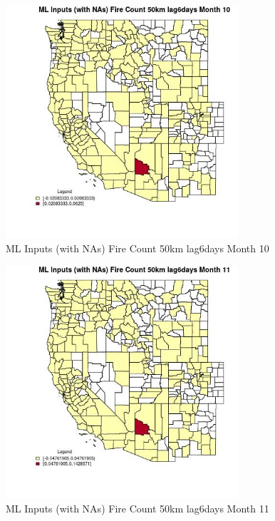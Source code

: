 \begin{figure} 
\centering  
\includegraphics[width=0.77\textwidth]{Code_Outputs/Report_ML_input_PM25_Step4_part_e_de_duplicated_aves_compiled_2019-05-21wNAs_CountyFire_Count_50km_lag6daysmedianMonth10.jpg} 
\caption{\label{fig:Report_ML_input_PM25_Step4_part_e_de_duplicated_aves_compiled_2019-05-21wNAsCountyFire_Count_50km_lag6daysmedianMonth10}ML Inputs (with NAs) Fire Count 50km lag6days Month 10} 
\end{figure} 
 

\clearpage 

\begin{figure} 
\centering  
\includegraphics[width=0.77\textwidth]{Code_Outputs/Report_ML_input_PM25_Step4_part_e_de_duplicated_aves_compiled_2019-05-21wNAs_CountyFire_Count_50km_lag6daysmedianMonth11.jpg} 
\caption{\label{fig:Report_ML_input_PM25_Step4_part_e_de_duplicated_aves_compiled_2019-05-21wNAsCountyFire_Count_50km_lag6daysmedianMonth11}ML Inputs (with NAs) Fire Count 50km lag6days Month 11} 
\end{figure} 
 

